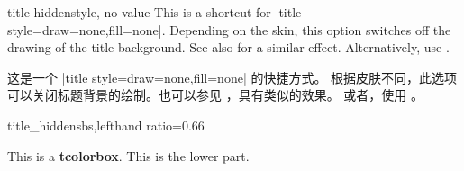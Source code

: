\begin{docTcbKey}{title hidden}{}{style, no value}
This is a shortcut for |title style={draw=none,fill=none}|.
Depending on the skin, this option switches off the drawing of the
title background. See also  for a similar effect.
Alternatively, use .

这是一个 |title style={draw=none,fill=none}| 的快捷方式。 根据皮肤不同，此选项可以关闭标题背景的绘制。也可以参见 ，具有类似的效果。 或者，使用 。
\begin{exdispExample*}{title_hidden}{sbs,lefthand ratio=0.66}
\begin{tcolorbox}[title=My title,
enhanced,title hidden]
This is a \textbf{tcolorbox}.
\tcblower
This is the lower part.
\end{tcolorbox}
\end{exdispExample*}
\end{docTcbKey}

